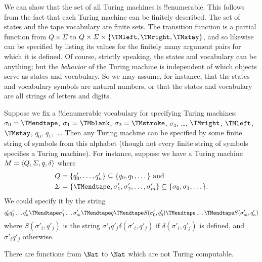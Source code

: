 \documentclass[../../../include/open-logic-section]{subfiles}
\begin{document}

\begin{explain}
We can show that the set of all Turing machines is
!!{enumerable}. This follows from the fact that each Turing machine
can be finitely described.  The set of states and the tape vocabulary
are finite sets.  The transition function is a partial function from
$Q \times \Sigma$ to $Q \times \Sigma \times \{\TMleft, \TMright,
\TMstay\}$, and so likewise can be specified by listing its values for
the finitely many argument pairs for which it is defined.  Of course,
strictly speaking, the states and vocabulary can be anything; but the
\emph{behavior} of the Turing machine is independent of which objects
serve as states and vocabulary. So we may assume, for instance, that
the states and vocabulary symbols are natural numbers, or that the
states and vocabulary are all strings of letters and digits.

Suppose we fix a !!{denumerable} vocabulary for specifying Turing
machines: $\sigma_0 = \TMendtape$, $\sigma_1 = \TMblank$, $\sigma_2 =
\TMstroke$, $\sigma_3$, \dots, $\TMright$, $\TMleft$, $\TMstay$,
$q_0$, $q_1$, \dots. Then any Turing machine can be specified by some
finite string of symbols from this alphabet (though not every finite
string of symbols specifies a Turing machine). For instance, suppose
we have a Turing machine $M = \langle Q, \Sigma, q, \delta \rangle$ where
\begin{align*}
  Q & =
  \{q'_0, \dots, q'_n\} \subseteq \{q_0, q_1, \dots \} \text{ and}\\
  \Sigma & = \{\TMendtape, \sigma'_1, \sigma'_2, \dots, \sigma'_m\}
  \subseteq \{\sigma_0, \sigma_1, \dots\}.
\end{align*}
We could specify it by the string
\[
q'_0 q'_1 \dots q'_n \TMendtape \sigma'_1 \dots \sigma'_m \TMendtape q
\TMendtape S(\sigma'_0,q'_0)\TMendtape \dots \TMendtape S(\sigma'_m, q'_n)
\]
where $S(\sigma'_i, q'_j) $ is the string $\sigma'_i q'_j
\delta(\sigma'_i, q'_j)$ if $\delta(\sigma'_i,q'_j)$ is defined, and
$\sigma'_i q'_j$ otherwise.
\end{explain}

\begin{thm}
There are functions from $\Nat$ to $\Nat$ which are not Turing
computable.
\end{thm}
\end{document}
